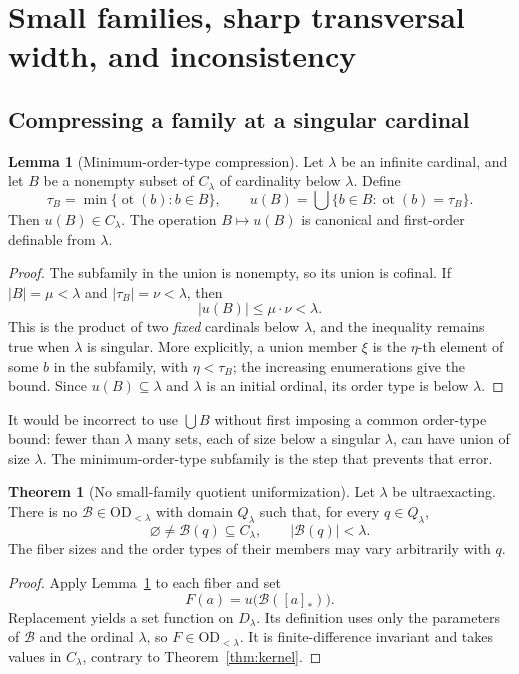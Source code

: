 \documentclass[11pt,letterpaper]{article}
\theoremstyle{definition}
\newtheorem{theorem}[definition]{Theorem}
\newtheorem{lemma}[definition]{Lemma}
\numberwithin{equation}{section}
\newcommand{\OD}{\mathrm{OD}}
\newcommand{\ot}{\operatorname{ot}}
\newcommand{\Dlam}{D_\lambda}
\newcommand{\Qlam}{Q_\lambda}
\newcommand{\Clam}{C_\lambda}
\newcommand{\ODlo}{\OD_{<\lambda}}
\newcommand{\qclass}[1]{[#1]_{*}}
\begin{document}
\section{Small families, sharp transversal width, and inconsistency}\label{sec:widthnew}

\subsection{Compressing a family at a singular cardinal}

\begin{lemma}[Minimum-order-type compression]\label{lem:compress}
Let $\lambda$ be an infinite cardinal, and let $B$ be a nonempty subset of $\Clam$ of cardinality below $\lambda$. Define
\[
\tau_B=\min\{\ot(b):b\in B\},\qquad
u(B)=\bigcup\{b\in B:\ot(b)=\tau_B\}.
\]
Then $u(B)\in\Clam$. The operation $B\mapsto u(B)$ is canonical and first-order definable from $\lambda$.
\end{lemma}

\begin{proof}
The subfamily in the union is nonempty, so its union is cofinal. If $|B|=\mu<\lambda$ and $|\tau_B|=\nu<\lambda$, then
\[
|u(B)|\le\mu\cdot\nu<\lambda.
\]
This is the product of two \emph{fixed} cardinals below $\lambda$, and the inequality remains true when $\lambda$ is singular. More explicitly, a union member $\xi$ is the $\eta$-th element of some $b$ in the subfamily, with $\eta<\tau_B$; the increasing enumerations give the bound. Since $u(B)\subseteq\lambda$ and $\lambda$ is an initial ordinal, its order type is below $\lambda$.
\end{proof}

It would be incorrect to use $\bigcup B$ without first imposing a common order-type bound: fewer than $\lambda$ many sets, each of size below a singular $\lambda$, can have union of size $\lambda$. The minimum-order-type subfamily is the step that prevents that error.

\begin{theorem}[No small-family quotient uniformization]\label{thm:family}
Let $\lambda$ be ultraexacting. There is no $\mathcal B\in\ODlo$ with domain $\Qlam$ such that, for every $q\in\Qlam$,
\[
\varnothing\ne\mathcal B(q)\subseteq\Clam,
\qquad |\mathcal B(q)|<\lambda.
\]
The fiber sizes and the order types of their members may vary arbitrarily with $q$.
\end{theorem}

\begin{proof}
Apply Lemma~\ref{lem:compress} to each fiber and set
\[
F(a)=u\bigl(\mathcal B(\qclass a)\bigr).
\]
Replacement yields a set function on $\Dlam$. Its definition uses only the parameters of $\mathcal B$ and the ordinal $\lambda$, so $F\in\ODlo$. It is finite-difference invariant and takes values in $\Clam$, contrary to Theorem~\ref{thm:kernel}.
\end{proof}
\end{document}

